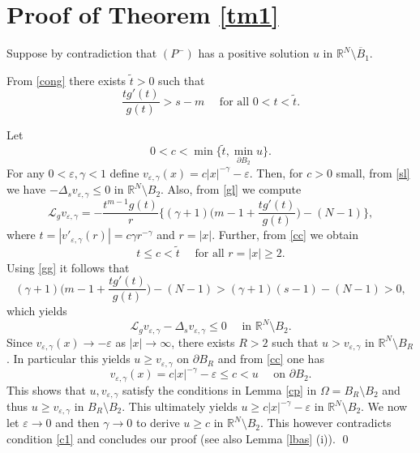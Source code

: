 \documentclass[10pt,a4paper]{amsart}
\numberwithin{equation}{section}
\newcommand{\R}{\mathbb R}
\newcommand{\Ro}{\mathbb R^N\setminus \overline B_1}
\newcommand{\Lg}{{\mathcal L}_g}
\begin{document}
\section{Proof of Theorem \ref{tm1}}

Suppose by contradiction that $(P^-)$ has a positive solution $u$ in $\Ro$.

From \eqref{cong} there exists $\tilde t>0$ such that 
\begin{equation}\label{gg}
\frac{tg'(t)}{g(t)}>s-m\quad\mbox{ for all }0<t<\widetilde t.
\end{equation}

Let 
\begin{equation}\label{cc}
0<c<\min\Big\{\tilde t, \min_{\partial B_{2}}u\Big\}.
\end{equation}
For any $0<\varepsilon, \gamma<1$ define $v_{\varepsilon, \gamma}(x)=c|x|^{-\gamma}-\varepsilon$. Then, for $c>0$ small, from \eqref{sl} we have $-\Delta_s v_{\varepsilon, \gamma}\leq 0$ in $\R^N\setminus B_{2}$. Also, from \eqref{gl}  we compute
$$
\Lg v_{\varepsilon, \gamma}=-\frac{t^{m-1}g(t)}{r}\Big\{(\gamma+1)\Big(m-1+\frac{tg'(t)}{g(t)}\Big)-(N-1)\Big\},
$$
where $t=|v'_{\varepsilon, \gamma}(r)|=c\gamma r^{-\gamma}$ and $r=|x|$. Further, from \eqref{cc} we obtain
$$
t\leq c<\tilde t \quad\mbox{ for all }r=|x|\geq 2.
$$
Using \eqref{gg} it follows that 
$$
(\gamma+1)\Big(m-1+\frac{tg'(t)}{g(t)}\Big)-(N-1)> (\gamma+1)(s-1)-(N-1)>0,
$$
which yields 
\begin{equation}\label{cc1}
\Lg v_{\varepsilon, \gamma}-\Delta_s v_{\varepsilon, \gamma}\leq 0\quad\mbox{ in }\R^N\setminus B_{2}.
\end{equation} 
Since $v_{\varepsilon, \gamma}(x)\to -\varepsilon$ as $|x|\to \infty$, there exists $R>2$ such that $u>v_{\varepsilon, \gamma}$ in $\R^N\setminus B_R$. In particular this yields $u\geq v_{\varepsilon, \gamma}$ on $\partial B_R$ and from \eqref{cc} one has 
$$
v_{\varepsilon, \gamma}(x)=c|x|^{-\gamma}-\varepsilon\leq c<u \quad\mbox{ on }\partial B_{2}.
$$
This shows that $u, v_{\varepsilon, \gamma}$ satisfy the conditions in Lemma \ref{cp} in $\Omega=B_R\setminus B_{2}$ and thus $u\geq v_{\varepsilon, \gamma}$ in $B_R\setminus B_{2}$. This ultimately yields $u\geq c|x|^{-\gamma}-\varepsilon$ in $\R^N\setminus B_{2}$. We now let $\varepsilon\to 0$ and then $\gamma\to 0$ to derive $u\geq c$ in $\R^N\setminus B_{2}$. This however contradicts  condition \eqref{c1} and concludes our proof (see also Lemma \ref{lbas} (i)).
\qed
\end{document}
